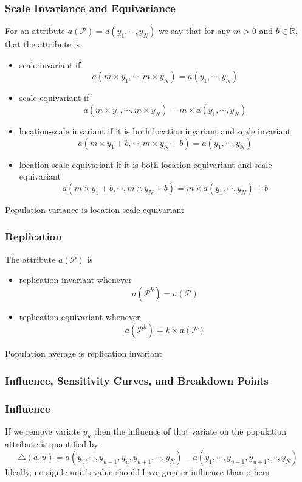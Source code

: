 \documentclass[11pt]{article}
\newcommand{\R}{{\mathbb{R}}}
\newcommand{\tri}{\triangle}
\begin{document}
\subsubsection*{Scale Invariance and Equivariance}
For an attribute $a(\mathcal{P}) = a(y_1,\cdots,y_N)$ we say that for any $m>0$ and $b\in\R$, that the attribute is
\begin{itemize}
    \item scale invariant if \[a(m\times y_1,\cdots,m\times y_N)=a(y_1,\cdots,y_N)\]
    \item scale equivariant if \[a(m\times y_1,\cdots,m\times y_N)=m\times a(y_1,\cdots,y_N)\]
    \item location-scale invariant if it is both location invariant and scale invariant \[a(m\times y_1+b,\cdots,m\times y_N+b)=a(y_1,\cdots,y_N)\]
    \item location-scale equivariant if it is both location equivariant and scale equivariant \[a(m\times y_1+b,\cdots,m\times y_N+b)=m\times a(y_1,\cdots,y_N)+b\]
\end{itemize}
Population variance is location-scale equivariant
\subsubsection*{Replication}
The attribute $a(\mathcal{P})$ is 
\begin{itemize}
    \item replication invariant whenever \[a(\mathcal{P}^k)=a(\mathcal{P})\] 
    \item replication equivariant whenever \[a(\mathcal{P}^k)=k\times a(\mathcal{P})\]
\end{itemize}
Population average is replication invariant 
\subsubsection{Influence, Sensitivity Curves, and Breakdown Points}
\subsubsection*{Influence}
If we remove variate $y_u$ then the influence of that variate on the population attribute is quantified by 
\[\tri(a,u)=a(y_1,\cdots,y_{u-1},y_u,y_{u+1},\cdots,y_N)-a(y_1,\cdots,y_{u-1},y_{u+1},\cdots,y_N)\]
Ideally, no signle unit's value should have greater influence than others
\end{document}
